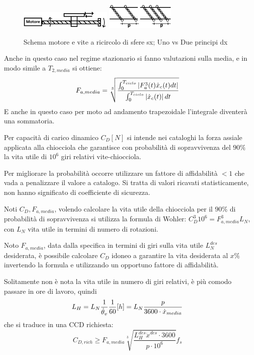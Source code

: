 \begin{figure}[h]
    \centering
    \includegraphics[width=0.4\textwidth]{Immagini/mot_vite_ricircolo.png}
    \includegraphics[width=0.3\textwidth]{Immagini/principi_viti_ricircolo.png}
    \caption{Schema motore e vite a ricircolo di sfere sx; Uno vs Due principi dx}
\end{figure}

Anche in questo caso nel regime stazionario si fanno valutazioni sulla media, e in modo simile a \( T_{2,media} \) si ottiene:
\[ F_{a, media} = \sqrt[3]{\frac{\int^{T_{ciclo}}_0 \left|F_a^3(t)\dot{x}_c(t)dt\right|}{\int^{T_{ciclo}}_0 \left|\dot{x}_c(t)\right|dt}} \]
E anche in questo caso per moto ad andamento trapezoidale l'integrale diventerà una sommatoria.

Per capacità di carico dinamico \( C_D [N] \) si intende nei cataloghi la forza assiale applicata alla  chiocciola che garantisce con probabilità di sopravvivenza del \(90\%\) la vita utile di \(10^6\) giri relativi vite-chiocciola.

Per migliorare la probabilità occorre utilizzare un fattore di affidabilità \(<1\) che vada a penalizzare il valore a catalogo. Si tratta di valori ricavati statisticamente, non hanno significato di coefficiente di sicurezza.

Noti \(C_D, F_{a, media}\), volendo calcolare la vita utile della chiocciola per il \(90\%\) di probabilità di sopravvivenza si utilizza la formula di Wohler: \( C_D^3 10^6 = F_{a,media}^3 L_N \), con \(L_N\) vita utile in termini di numero di rotazioni.

Noto \(F_{a,media}\), data dalla specifica in termini di giri sulla vita utile \(L_N^{des}\) desiderata, è possibile calcolare \(C_D\) idoneo a garantire la vita desiderata al \(x\%\) invertendo la formula e utilizzando un opportuno fattore di affidabilità.

Solitamente non è nota la vita utile in numero di giri relativi, è più comodo passare in ore di lavoro, quindi 
\[ L_H = L_N \frac{1}{\dot{\theta}_v} \frac{1}{60} [h] = L_N \frac{p}{3600 \cdot \dot{x}_{media}} \]
che si traduce in una CCD richiesta: 
\[ C_{D,rich} \geqslant F_{a,media} \sqrt[3]{\frac{L_H^{des}\dot{x}^{des} \cdot 3600}{p \cdot 10^6}} f_s \]

